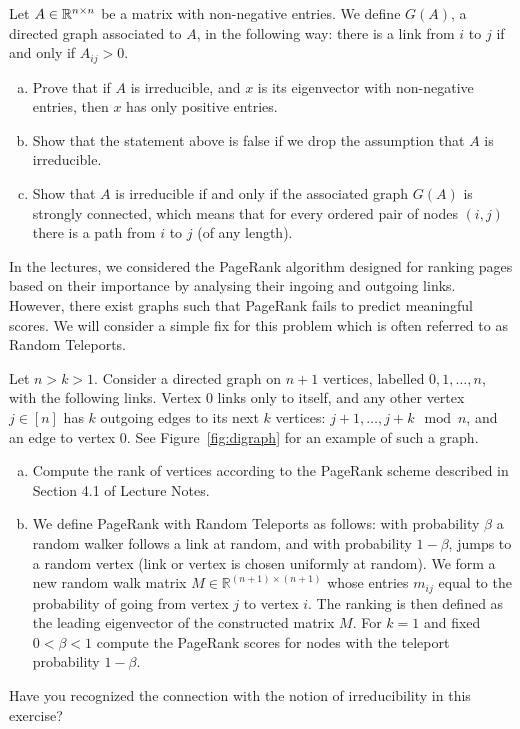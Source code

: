 \begin{myexercise}\label{prob:irreducible_matrix}
    Let $A \in \mathbb{R}^{n\times n}$ be a matrix with non-negative entries. We define $G(A)$, a directed graph associated to $A$, in the following way: there is a link from $i$ to $j$ if and only if $A_{ij} > 0$.
    \begin{enumerate}[(a)]
        \item Prove that if $A$ is irreducible, and $x$ is its eigenvector with non-negative entries, then $x$ has only positive entries.
        \item Show that the statement above is false if we drop the assumption that $A$ is irreducible.
        \item Show that $A$ is irreducible if and only if the associated graph $G(A)$ is strongly connected, which means that for every ordered pair of nodes $(i,j)$ there is a path from $i$ to $j$ (of any length).
    \end{enumerate}
\end{myexercise}


\begin{myexercise}\label{prob:pagerank}
    In the lectures, we considered the PageRank algorithm designed for ranking pages based on their importance by analysing their ingoing and outgoing links. However, there exist graphs such that PageRank fails to predict meaningful scores. We will consider a simple fix for this problem which is often referred to as Random Teleports.

    Let $n > k > 1$. Consider a directed graph on $n + 1$ vertices, labelled $0, 1, \ldots, n$, with the following links. Vertex $0$ links only to itself, and any other vertex $j \in [n]$ has $k$ outgoing edges to its next $k$ vertices: $j + 1, \ldots, j + k \mod n$, and an edge to vertex $0$. See Figure~\ref{fig:digraph} for an example of such a graph.
    \begin{enumerate}[(a)]
        \item Compute the rank of vertices according to the PageRank scheme described in Section 4.1 of Lecture Notes.
        \item We define PageRank with Random Teleports as follows: with probability $\beta$ a random walker follows a link at random, and with probability $ 1 - \beta$, jumps to a random vertex (link or vertex is chosen uniformly at random). We form a new random walk matrix $M \in \mathbb{R}^{(n+1)\times (n+1)}$ whose entries $m_{ij}$ equal to the probability of going from vertex $j$ to vertex $i$. The ranking is then defined as the leading eigenvector of the constructed matrix $M$. For $k=1$ and fixed $0 < \beta < 1$ compute the PageRank scores for nodes with the teleport probability $1 - \beta$.
    \end{enumerate}
\end{myexercise}
\begin{remark}
    Have you recognized the connection with the notion of irreducibility in this exercise?
\end{remark}

